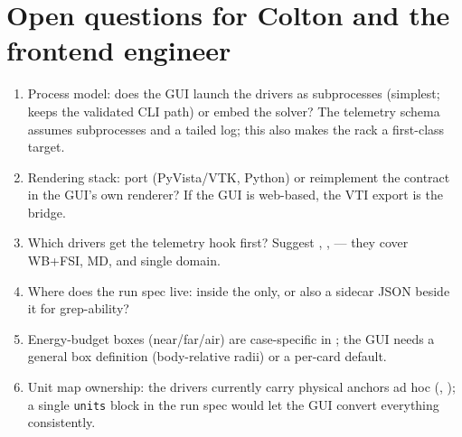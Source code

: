 \documentclass[11pt,a4paper]{article}
\newcommand{\code}[1]{\texttt{#1}}
\begin{document}
\section{Open questions for Colton and the frontend engineer}\label{sec:open}
\begin{enumerate}
\item Process model: does the GUI launch the drivers as subprocesses (simplest;
  keeps the validated CLI path) or embed the solver? The telemetry schema assumes
  subprocesses and a tailed log; this also makes the rack a first-class target.
\item Rendering stack: port  (PyVista/VTK, Python) or
  reimplement the contract in the GUI's own renderer? If the GUI is web-based,
  the VTI export is the bridge.
\item Which drivers get the telemetry hook first? Suggest
  , ,
   --- they cover WB+FSI, MD, and single domain.
\item Where does the run spec live: inside the  only, or also a sidecar
  JSON beside it for grep-ability?
\item Energy-budget boxes (near/far/air) are case-specific in
  ; the GUI needs a general box definition (body-relative
  radii) or a per-card default.
\item Unit map ownership: the drivers currently carry physical anchors ad hoc
  (, ); a single \code{units} block in the run spec would
  let the GUI convert everything consistently.
\end{enumerate}

\appendix
\end{document}
